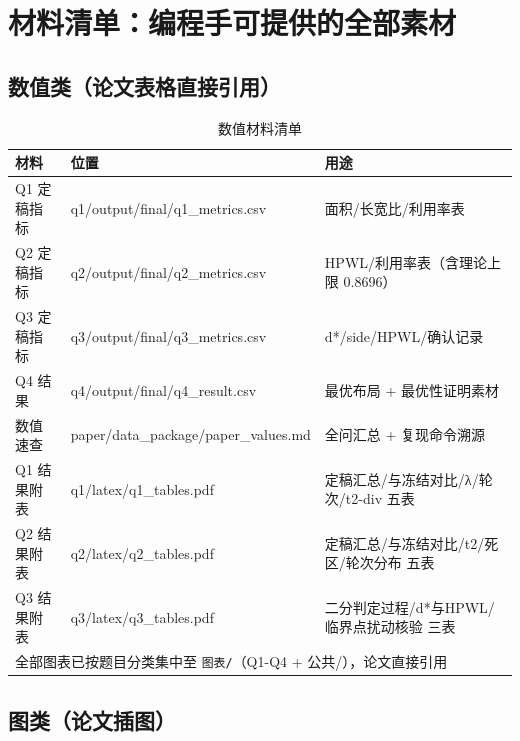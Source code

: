 \documentclass[12pt,a4paper]{article}
\begin{document}
\section{材料清单：编程手可提供的全部素材}
\label{sec:materials}

\subsection{数值类（论文表格直接引用）}

\begin{table}[H]
\centering
\caption{数值材料清单}
\scriptsize
\setlength{\tabcolsep}{2pt}
\begin{tabular}{lll}
\toprule
材料 & 位置 & 用途 \\
\midrule
Q1 定稿指标 & q1/output/final/q1\_metrics.csv & 面积/长宽比/利用率表 \\
Q2 定稿指标 & q2/output/final/q2\_metrics.csv & HPWL/利用率表（含理论上限 0.8696） \\
Q3 定稿指标 & q3/output/final/q3\_metrics.csv & d*/side/HPWL/确认记录 \\
Q4 结果 & q4/output/final/q4\_result.csv & 最优布局 + 最优性证明素材 \\
数值速查 & paper/data\_package/paper\_values.md & 全问汇总 + 复现命令溯源 \\
Q1 结果附表 & q1/latex/q1\_tables.pdf & 定稿汇总/与冻结对比/λ/轮次/t2-div 五表 \\
Q2 结果附表 & q2/latex/q2\_tables.pdf & 定稿汇总/与冻结对比/t2/死区/轮次分布 五表 \\
Q3 结果附表 & q3/latex/q3\_tables.pdf & 二分判定过程/d*与HPWL/临界点扰动核验 三表 \\
\multicolumn{3}{l}{\footnotesize 全部图表已按题目分类集中至 \texttt{图表/}（Q1-Q4 + 公共/），论文直接引用} \\
\bottomrule
\end{tabular}
\end{table}

\subsection{图类（论文插图）}
\end{document}
